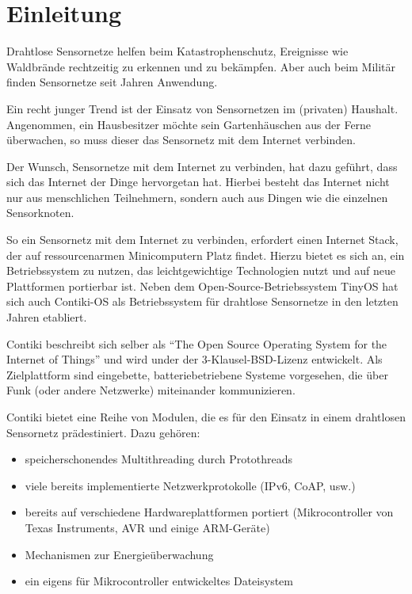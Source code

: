 \chapter{Einleitung}

	Drahtlose Sensornetze helfen beim Katastrophenschutz, Ereignisse
	wie Waldbrände rechtzeitig zu erkennen und zu bekämpfen.
	Aber auch beim Militär finden Sensornetze seit Jahren Anwendung.
	
	Ein recht junger Trend ist der Einsatz von Sensornetzen im (privaten)
	Haushalt. Angenommen, ein Hausbesitzer möchte sein Gartenhäuschen
	aus der Ferne überwachen, so muss dieser das Sensornetz mit dem Internet
	verbinden.

	Der Wunsch, Sensornetze mit dem Internet zu verbinden, hat dazu geführt,
	dass sich das Internet der Dinge hervorgetan hat. Hierbei besteht das
	Internet nicht nur aus menschlichen Teilnehmern, sondern auch aus Dingen
	wie die einzelnen Sensorknoten.

	So ein Sensornetz mit dem Internet zu verbinden, erfordert
	einen Internet Stack, der auf ressourcenarmen Minicomputern
	Platz findet. Hierzu bietet es sich an, ein Betriebssystem zu nutzen,
	das leichtgewichtige Technologien nutzt und auf neue Plattformen
	portierbar ist.
	Neben dem Open-Source-Betriebssystem TinyOS hat sich auch Contiki-OS
	als Betriebssystem für drahtlose Sensornetze in den letzten Jahren
	etabliert.

	\medskip

	Contiki beschreibt sich selber als \enquote{The Open Source Operating
	System for the Internet of Things} \autocite{contiki} und
	wird under der 3-Klausel-BSD-Lizenz entwickelt.
	Als Zielplattform sind eingebette, batteriebetriebene Systeme
	vorgesehen, die über Funk (oder andere Netzwerke) miteinander
	kommunizieren.

	Contiki bietet eine Reihe von Modulen, die es für den Einsatz in einem
	drahtlosen Sensornetz prädestiniert.  Dazu gehören:
	\begin{itemize}
	\item	speicherschonendes Multithreading durch Protothreads
	\item	viele bereits implementierte Netzwerkprotokolle
			(\acs{IP}v6, \acs{CoAP}, usw.)
	\item	bereits auf verschiedene Hardwareplattformen portiert
		(Mikrocontroller von Texas Instruments, AVR und einige
		ARM-Geräte)
	\item	Mechanismen zur Energieüberwachung
	\item	ein eigens für Mikrocontroller entwickeltes Dateisystem
	\end{itemize}

